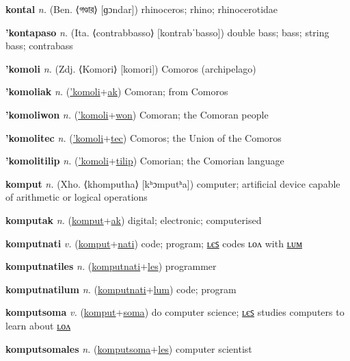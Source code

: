\textbf{\hypertarget{kontal}{kontal}} \textit{n.} (Ben. ⟨{\bengali{}গণ্ডার}⟩ [ɡɔndar])
rhinoceros; rhino; rhinocerotidae

\textbf{\hypertarget{'kontapaso}{'kontapaso}} \textit{n.} (Ita. ⟨contrabbasso⟩ [kontrabˈbasso])
double bass; bass; string bass; contrabass

\textbf{\hypertarget{'komoli}{'komoli}} \textit{n.} (Zdj. ⟨Komori⟩ [komori])
Comoros (archipelago)

\textbf{\hypertarget{'komoliak}{'komoliak}} \textit{n.} (\hyperlink{'komoli}{'komoli}+\allowbreak \hyperlink{ak}{ak})
Comoran; from Comoros

\textbf{\hypertarget{'komoliwon}{'komoliwon}} \textit{n.} (\hyperlink{'komoli}{'komoli}+\allowbreak \hyperlink{won}{won})
Comoran; the Comoran people

\textbf{\hypertarget{'komolitec}{'komolitec}} \textit{n.} (\hyperlink{'komoli}{'komoli}+\allowbreak \hyperlink{tec}{tec})
Comoros; the Union of the Comoros

\textbf{\hypertarget{'komolitilip}{'komolitilip}} \textit{n.} (\hyperlink{'komoli}{'komoli}+\allowbreak \hyperlink{tilip}{tilip})
Comorian; the Comorian language

\textbf{\hypertarget{komput}{komput}} \textit{n.} (Xho. ⟨khomputha⟩ [kʰɔmputʰa])
computer; artificial device capable of arithmetic or logical operations

\textbf{\hypertarget{komputak}{komputak}} \textit{n.} (\hyperlink{komput}{komput}+\allowbreak \hyperlink{ak}{ak})
digital; electronic; computerised

\textbf{\hypertarget{komputnati}{komputnati}} \textit{v.} (\hyperlink{komput}{komput}+\allowbreak \hyperlink{nati}{nati})
code; program; \hyperlink{komputnatiles}{ʟєꜱ} codes ʟᴏᴧ with \hyperlink{komputnatilum}{ʟᴜᴍ}

\textbf{\hypertarget{komputnatiles}{komputnatiles}} \textit{n.} (\hyperlink{komputnati}{komputnati}+\allowbreak \hyperlink{les}{les})
programmer

\textbf{\hypertarget{komputnatilum}{komputnatilum}} \textit{n.} (\hyperlink{komputnati}{komputnati}+\allowbreak \hyperlink{lum}{lum})
code; program

\textbf{\hypertarget{komputsoma}{komputsoma}} \textit{v.} (\hyperlink{komput}{komput}+\allowbreak \hyperlink{soma}{soma})
do computer science; \hyperlink{komputsomales}{ʟєꜱ} studies computers to learn about \hyperlink{komputsomalon}{ʟᴏᴧ}

\textbf{\hypertarget{komputsomales}{komputsomales}} \textit{n.} (\hyperlink{komputsoma}{komputsoma}+\allowbreak \hyperlink{les}{les})
computer scientist

